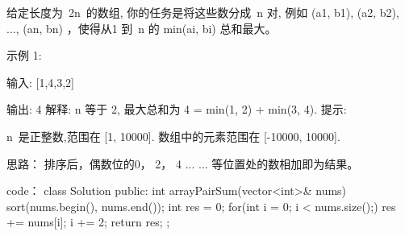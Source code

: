 给定长度为 2n 的数组, 你的任务是将这些数分成 n 对, 例如 (a1, b1), (a2, b2), ..., (an, bn) ，使得从1 到 n 的 min(ai, bi) 总和最大。

示例 1:

输入: [1,4,3,2]

输出: 4
解释: n 等于 2, 最大总和为 4 = min(1, 2) + min(3, 4).
提示:

n 是正整数,范围在 [1, 10000].
数组中的元素范围在 [-10000, 10000].



























思路：
排序后，偶数位的0， 2， 4 ... ... 等位置处的数相加即为结果。



























code：
class Solution {
public:
    int arrayPairSum(vector<int>& nums) {
        sort(nums.begin(), nums.end());
        int res = 0;
        for(int i = 0; i < nums.size();)
        {
            res += nums[i];
            i += 2;
        }
        return res;
    }
};